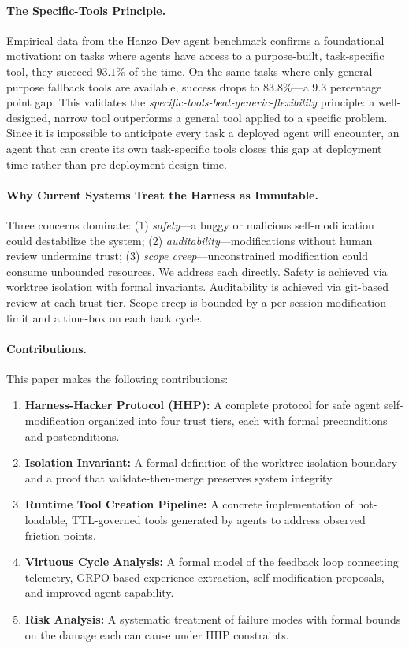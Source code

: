 \paragraph{The Specific-Tools Principle.}
Empirical data from the Hanzo Dev agent benchmark confirms a foundational
motivation: on tasks where agents have access to a purpose-built, task-specific
tool, they succeed $93.1\%$ of the time. On the same tasks where only
general-purpose fallback tools are available, success drops to $83.8\%$---a
$9.3$ percentage point gap. This validates the \emph{specific-tools-beat-generic-flexibility}
principle: a well-designed, narrow tool outperforms a general tool applied to a
specific problem. Since it is impossible to anticipate every task a deployed
agent will encounter, an agent that can create its own task-specific tools
closes this gap at deployment time rather than pre-deployment design time.

\paragraph{Why Current Systems Treat the Harness as Immutable.}
Three concerns dominate: (1) \emph{safety}---a buggy or malicious self-modification
could destabilize the system; (2) \emph{auditability}---modifications without
human review undermine trust; (3) \emph{scope creep}---unconstrained modification
could consume unbounded resources. We address each directly. Safety is achieved
via worktree isolation with formal invariants. Auditability is achieved via
git-based review at each trust tier. Scope creep is bounded by a
per-session modification limit and a time-box on each hack cycle.

\paragraph{Contributions.}
This paper makes the following contributions:

\begin{enumerate}[leftmargin=1.5em]
    \item \textbf{Harness-Hacker Protocol (HHP):} A complete protocol for
          safe agent self-modification organized into four trust tiers, each with
          formal preconditions and postconditions.
    \item \textbf{Isolation Invariant:} A formal definition of the worktree
          isolation boundary and a proof that validate-then-merge preserves
          system integrity.
    \item \textbf{Runtime Tool Creation Pipeline:} A concrete implementation
          of hot-loadable, TTL-governed tools generated by agents to address
          observed friction points.
    \item \textbf{Virtuous Cycle Analysis:} A formal model of the feedback
          loop connecting telemetry, GRPO-based experience extraction,
          self-modification proposals, and improved agent capability.
    \item \textbf{Risk Analysis:} A systematic treatment of failure modes with
          formal bounds on the damage each can cause under HHP constraints.
\end{enumerate}

